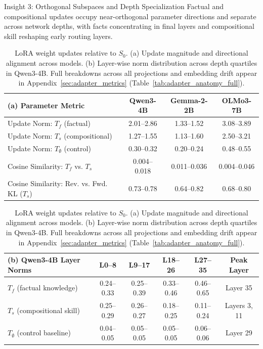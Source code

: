 \documentclass[]{template}
\theoremstyle{plain}
\theoremstyle{definition}
\theoremstyle{remark}
\begin{document}
\begin{observationbox}{Insight 3: Orthogonal Subspaces and Depth Specialization}
Factual and compositional updates occupy near-orthogonal parameter directions and separate across network depths, with facts concentrating in final layers and compositional skill reshaping early routing layers.
\end{observationbox}

\begin{table}[htbp]
\centering
\small
\caption{LoRA weight updates relative to $S_0$. (a) Update magnitude and directional alignment across models. (b) Layer-wise norm distribution across depth quartiles in Qwen3-4B. Full breakdowns across all projections and embedding drift appear in Appendix~\ref{sec:adapter_metrics} (Table~\ref{tab:adapter_anatomy_full}).}
\label{tab:adapter_anatomy}
\setlength{\tabcolsep}{8pt}
\renewcommand{\arraystretch}{1.08}
\begin{tabular}{@{}lccc@{}}
\toprule
\textbf{(a) Parameter Metric} & Qwen3-4B & Gemma-2-2B & OLMo3-7B \\
\midrule
Update Norm: $T_f$ (factual) & 2.01--2.86 & 1.33--1.52 & 3.08--3.89 \\
Update Norm: $T_s$ (compositional) & 1.27--1.55 & 1.13--1.60 & 2.50--3.21 \\
Update Norm: $T_\emptyset$ (control) & 0.30--0.32 & 0.20--0.24 & 0.48--0.55 \\
\midrule
Cosine Similarity: $T_f$ vs. $T_s$ & 0.004--0.018 & 0.011--0.036 & 0.004--0.046 \\
Cosine Similarity: Rev. vs. Fwd. KL ($T_s$) & 0.73--0.78 & 0.64--0.82 & 0.68--0.80 \\
\bottomrule
\end{tabular}
\par\smallskip
\begin{tabular}{@{}lccccc@{}}
\toprule
\textbf{(b) Qwen3-4B Layer Norms} & L0--8 & L9--17 & L18--26 & L27--35 & Peak Layer \\
\midrule
$T_f$ (factual knowledge) & 0.24--0.33 & 0.25--0.39 & 0.33--0.46 & 0.46--0.65 & Layer 35 \\
$T_s$ (compositional skill) & 0.25--0.29 & 0.26--0.27 & 0.18--0.25 & 0.11--0.24 & Layers 3, 11 \\
$T_\emptyset$ (control baseline) & 0.04--0.05 & 0.05--0.05 & 0.05--0.05 & 0.06--0.06 & Layer 29 \\
\bottomrule
\end{tabular}
\end{table}
\end{document}
